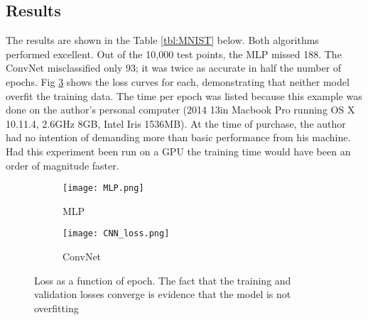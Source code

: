 \subsection{Results}
The results are shown in the Table \ref{tbl:MNIST} below.  Both algorithms performed excellent. Out of the 10,000 test points, the MLP missed 188.  The  ConvNet misclassified only 93;  it was twice as accurate in half the number of epochs.  Fig \ref{fig:MNIST} shows the loss curves for each, demonstrating that neither model overfit the training data.  The time per epoch was listed because this example was done on the author's personal computer (2014 13in Macbook Pro running OS X 10.11.4, 2.6GHz 8GB, Intel Iris 1536MB).  At the time of purchase, the author had no intention of demanding more than basic performance from his machine.  Had this experiment been run on a GPU the training time would have been an order of magnitude faster.  


\begin{table}[h!]
\centering
\caption{Results from Classifying MNIST}
\label{tbl:MNIST}
\end{table}


\begin{figure}[!h]
\centering
\begin{subfigure}{.5\linewidth}
  \texttt{[image: MLP.png]}
  \caption{MLP}
  \label{fig:MLP}
\end{subfigure}%
\hfill
\begin{subfigure}{.5\linewidth}
  \texttt{[image: CNN\_loss.png]}
  \caption{ConvNet}
  \label{fig:NN3}
\end{subfigure}
\caption{Loss as a function of epoch.  The fact that the training and validation losses converge is evidence that the model is not overfitting}
\label{fig:MNIST}
\end{figure}

